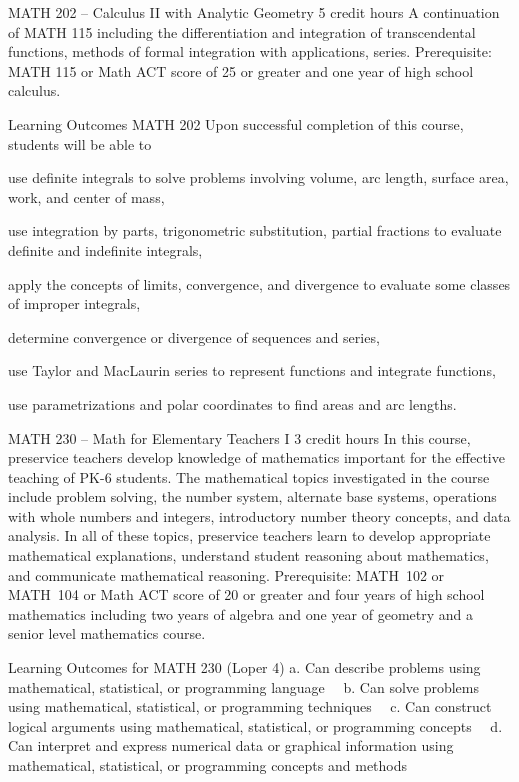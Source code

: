 MATH 202 – Calculus II with Analytic Geometry 5 credit hours
A continuation of MATH 115 including the differentiation and integration of transcendental functions, methods of formal integration with applications, series.
Prerequisite: MATH 115 or Math ACT score of 25 or greater and one year of high school calculus.

Learning Outcomes MATH 202
 Upon successful completion of this course, students will be able to 
    \item use definite integrals to solve problems involving volume, arc length, surface area, work, and center of mass, 
    \item use integration by parts, trigonometric substitution, partial fractions to evaluate definite and indefinite integrals,
    \item apply the concepts of limits, convergence, and divergence to evaluate some classes of improper integrals,
    \item determine convergence or divergence of sequences and series,
    \item use Taylor and MacLaurin series to represent functions and integrate functions,
    \item use parametrizations and polar coordinates to find areas and arc lengths.


MATH 230 – Math for Elementary Teachers I 3 credit hours
In this course, preservice teachers develop knowledge of mathematics important for the effective teaching of PK-6 students. The mathematical topics investigated in the course include problem solving, the number system, alternate base systems, operations with whole numbers and integers, introductory number theory concepts, and data analysis. In all of these topics, preservice teachers learn to develop appropriate mathematical explanations, understand student reasoning about mathematics, and communicate mathematical reasoning.
Prerequisite: MATH 102 or MATH 104 or Math ACT score of 20 or greater and four years of high school mathematics including two years of algebra and one year of geometry and a senior level mathematics course.

Learning Outcomes for MATH 230 (Loper 4)
a. Can describe problems using mathematical, statistical, or programming language  
b. Can solve problems using mathematical, statistical, or programming techniques  
c. Can construct logical arguments using mathematical, statistical, or programming concepts  
d. Can interpret and express numerical data or graphical information using mathematical, statistical, or programming concepts and methods  

